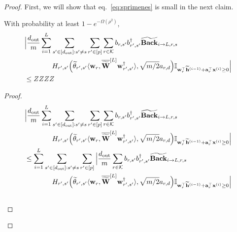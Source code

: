\begin{claim}
\begin{proof}
				First, we will show that eq.~\ref{eq:sprimenes} is small in the next claim.
				\begin{claim}
					With probability at least $1-e^{-\Omega(\rho^2)}$,
					\begin{align*}
						&\Big|\frac{\dout }{m} \sum_{i=1}^{L}  \sum_{s' \in [\dout ]: s' \ne s} \sum_{r' \in [p]} \sum_{r \in \mathcal{K}}  b_{r, s'} b_{r', s'}^{\dagger} \widetilde{\mathbf{Back}}_{i \to L, r, s} \\& \quad \quad \quad \quad H_{r', s'}\Big(\widetilde{\theta}_{r', s'} \langle \mathbf{w}_{r}, \overline{\widetilde{\mathbf{W}}}^{[L]} \mathbf{w}_{r', s'}^{\dagger}\rangle , \sqrt{m/2} a_{r, d}\Big) \mathbb{I}_{\mathbf{w}_r^{\top} \widetilde{\mathbf{h}}^{(i-1)} + \mathbf{a}_r^{\top} \mathbf{x}^{(i)} \ge 0}\Big| \\&
						\le ZZZZ%
					\end{align*}
				\end{claim}
				
				\begin{proof}
					\begingroup \allowdisplaybreaks
					\begin{align*}
						&\Big|\frac{d_{\mathrm{out}} }{m} \sum_{i=1}^{L}  \sum_{s' \in [d_{\mathrm{out}} ]: s' \ne s} \sum_{r' \in [p]} \sum_{r \in \mathcal{K}}  b_{r, s'} b_{r', s'}^{\dagger} \widetilde{\mathbf{Back}}_{i \to L, r, s} \\& \quad \quad \quad \quad H_{r', s'}\Big(\widetilde{\theta}_{r', s'} \langle \mathbf{w}_{r}, \overline{\widetilde{\mathbf{W}}}^{[L]} \mathbf{w}_{r', s'}^{\dagger}\rangle , \sqrt{m/2} a_{r, d}\Big) \mathbb{I}_{\mathbf{w}_r^{\top} \widetilde{\mathbf{h}}^{(i-1)} + \mathbf{a}_r^{\top} \mathbf{x}^{(i)} \ge 0}\Big| \\&
						\le \sum_{i=1}^{L}  \sum_{s' \in [d_{\mathrm{out}} ]: s' \ne s} \sum_{r' \in [p]} \Big|\frac{d_{\mathrm{out}} }{m} \sum_{r \in \mathcal{K}}  b_{r, s'} b_{r', s'}^{\dagger} \widetilde{\mathbf{Back}}_{i \to L, r, s} \\& \quad \quad \quad \quad H_{r', s'}\Big(\widetilde{\theta}_{r', s'} \langle \mathbf{w}_{r}, \overline{\widetilde{\mathbf{W}}}^{[L]} \mathbf{w}_{r', s'}^{\dagger}\rangle , \sqrt{m/2} a_{r, d}\Big) \mathbb{I}_{\mathbf{w}_r^{\top} \widetilde{\mathbf{h}}^{(i-1)} + \mathbf{a}_r^{\top} \mathbf{x}^{(i)} \ge 0}\Big| \\&
					\end{align*}
					\endgroup
				\end{proof}
				

\end{proof}
\end{claim}
